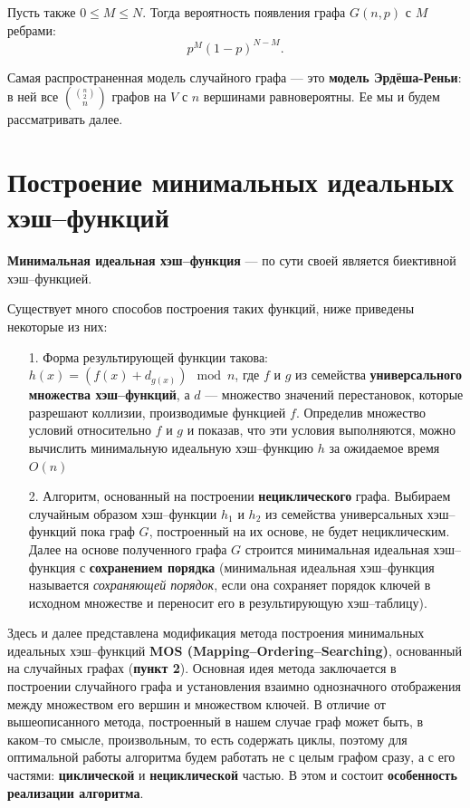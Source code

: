 \documentclass[specialist,
               substylefile = spbu.rtx,
               subf,href,colorlinks=true, 12pt]{disser}
\begin{document}
Пусть также $0 \leq M \leq N$. Тогда вероятность появления графа $G(n,p)$ с $M$ ребрами:
%
\begin{equation}
p^M(1-p)^{N - M}.
\end{equation}
%

Самая распространенная модель случайного графа --- это \textbf{модель Эрдёша-Реньи}: в ней все $\binom{\binom{n}{2}}{n}$ графов на $V$ с $n$ вершинами равновероятны. Ее мы и будем рассматривать далее.


\newpage

\section{Построение минимальных идеальных хэш--функций}

\textbf{Минимальная идеальная хэш--функция} --- по сути своей является биективной хэш--функцией. 

Существует много способов построения таких функций, ниже приведены некоторые из них:

\begin{itemize}
\item[1.] Форма результирующей функции такова: $h(x) = (f(x) + d_{g(x)}) \mod n$, где $f$ и $g$ из семейства \textbf{универсального множества хэш--функций}, а $d$ --- множество значений перестановок, которые разрешают коллизии, производимые функцией $f$. Определив множество условий относительно $f$ и $g$ и показав, что эти условия выполняются, можно вычислить минимальную идеальную хэш--функцию $h$ за ожидаемое время $\mathit{O}(n)$
\item[2.] Алгоритм, основанный на построении \textbf{нециклического} графа. Выбираем случайным образом хэш--функции $h_1$ и $h_2$ из семейства универсальных хэш--функций пока граф $G$, построенный на их основе, не будет нециклическим. Далее на основе полученного графа $G$ строится минимальная идеальная хэш--функция с \textbf{сохранением порядка} (минимальная идеальная хэш--функция называется \textit{сохраняющей порядок}, если она сохраняет порядок ключей в исходном множестве и переносит его в результирующую хэш--таблицу).\label{alg2}
\end{itemize}

Здесь и далее представлена модификация метода построения минимальных идеальных хэш--функций \textbf{MOS (Mapping--Ordering--Searching)}, основанный на случайных графах (\textbf{пункт 2}).
Основная идея метода заключается в построении случайного графа и установления взаимно однозначного отображения между множеством его вершин и множеством ключей. В отличие от вышеописанного метода, построенный в нашем случае граф может быть, в каком--то смысле, произвольным, то есть содержать циклы, поэтому для оптимальной работы алгоритма будем работать не с целым графом сразу, а с его частями: \textbf{циклической} и \textbf{нециклической} частью. В этом и состоит \textbf{особенность реализации алгоритма}.
\end{document}
